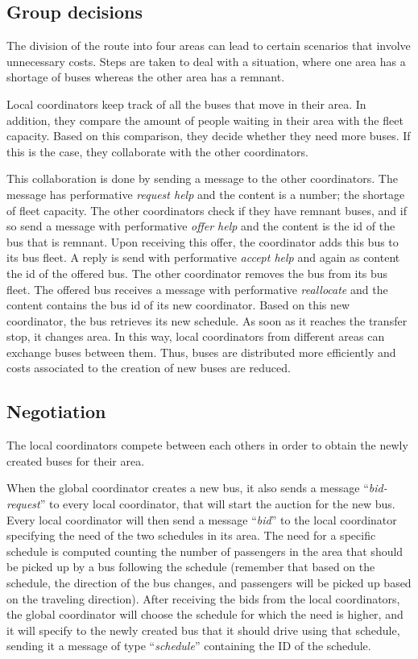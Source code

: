 \documentclass[a4paper]{article}
\begin{document}
\subsection{Group decisions}
The division of the route into four areas can lead to certain scenarios that involve unnecessary costs. Steps are taken to deal with a situation, where one area has a shortage of buses whereas the other area has a remnant. 

Local coordinators keep track of all the buses that move in their area. In addition, they compare the amount of people waiting in their area with the fleet capacity. Based on this comparison, they decide whether they need more buses. If this is the case, they collaborate with the other coordinators. 

This collaboration is done by sending a message to the other coordinators. The message has performative \textit{request help} and the content is a number; the shortage of fleet capacity. The other coordinators check if they have remnant buses, and if so send a message with performative \textit{offer help} and the content is the id of the bus that is remnant. Upon receiving this offer, the coordinator adds this bus to its bus fleet. A reply is send with performative \textit{accept help} and again as content the id of the offered bus. The other coordinator removes the bus from its bus fleet. The offered bus receives a message with performative \textit{reallocate} and the content contains the bus id of its new coordinator. Based on this new coordinator, the bus retrieves its new schedule. As soon as it reaches the transfer stop, it changes area. In this way, local coordinators from different areas can exchange buses between them. Thus, buses are distributed more efficiently and costs associated to the creation of new buses are reduced.

\subsection{Negotiation}
\label{subsec:negotiations}
The local coordinators compete between each others in order to obtain the newly created buses for their area.

When the global coordinator creates a new bus, it also sends a message ``\textit{bid-request}'' to every local coordinator, that will start the auction for the new bus. Every local coordinator will then send a message ``\textit{bid}'' to the local coordinator specifying the need of the two schedules in its area. The need for a specific schedule is computed counting the number of passengers in the area that should be picked up by a bus following the schedule (remember that based on the schedule, the direction of the bus changes, and passengers will be picked up based on the traveling direction). After receiving the bids from the local coordinators, the global coordinator will choose the schedule for which the need is higher, and it will specify to the newly created bus that it should drive using that schedule, sending it a message of type ``\textit{schedule}'' containing the ID of the schedule.
\end{document}
